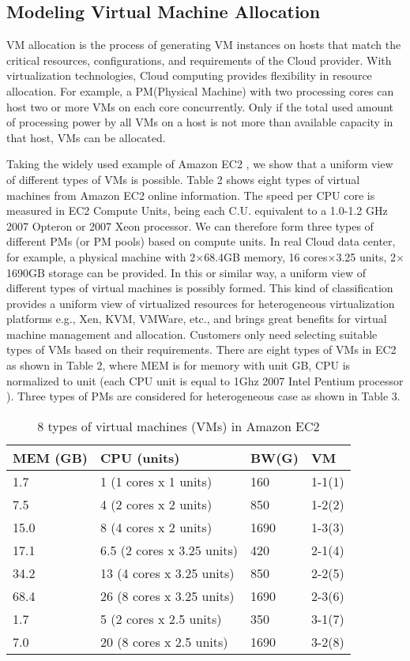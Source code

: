 \documentclass[3p, twocolumn]{elsarticle}
\begin{document}
\subsection{Modeling Virtual Machine Allocation}
VM allocation is the process of generating VM instances on hosts that match the critical resources, configurations, and requirements of the Cloud provider. With virtualization technologies, Cloud computing provides flexibility in resource allocation. For example, a PM(Physical Machine) with two processing cores can host two or more VMs on each core concurrently. Only if the total used amount of processing power by all VMs on a host is not more than available capacity in that host, VMs can be allocated.

Taking the widely used example of Amazon EC2 \cite{IEEEhowto:Amazon}, we show that a uniform view of different types of VMs is possible. Table 2 shows eight types of virtual machines from Amazon EC2 online information. The speed per CPU core is measured in EC2 Compute Units, being each C.U. equivalent to a 1.0-1.2 GHz 2007 Opteron or 2007 Xeon processor. We can therefore form three types of different PMs (or PM pools) based on compute units. In real Cloud data center, for example, a physical machine with 2$\times$68.4GB memory, 16 cores$\times$3.25 units, 2$\times$1690GB storage can be provided. In this or similar way, a uniform view of different types of virtual machines is possibly formed. This kind of classification provides a uniform view of virtualized resources for heterogeneous virtualization platforms e.g., Xen, KVM, VMWare, etc., and brings great benefits for virtual machine management and allocation. Customers only need selecting suitable types of VMs based on their requirements. There are eight types of VMs in EC2 as shown in Table 2, where MEM is for memory with unit GB, CPU is normalized to unit (each CPU unit is equal to 1Ghz 2007 Intel Pentium processor \cite{IEEEhowto:Amazon}). Three types of PMs are considered for heterogeneous case as shown in Table 3.
\begin{table}
\footnotesize
\caption{8 types of virtual machines (VMs) in Amazon EC2
}
\begin{center}
\begin{tabular}{|l|l|l||l|}
\hline MEM (GB) & CPU (units)& BW(G)&VM
\\\hline
\hline 1.7 & 1 (1 cores x 1 units)& 160& 1-1(1) \\
\hline 7.5 &4 (2 cores x 2 units) & 850& 1-2(2) \\
\hline 15.0& 8 (4 cores x 2 units) &1690&1-3(3) \\
\hline 17.1& 6.5 (2 cores x 3.25 units) &420&2-1(4)\\
\hline 34.2& 13 (4 cores x 3.25 units) &850&2-2(5)\\
\hline 68.4& 26 (8 cores x 3.25 units) &1690&2-3(6)\\
\hline 1.7& 5 (2 cores x 2.5 units) &350&3-1(7) \\
\hline 7.0& 20 (8 cores x 2.5 units) &1690&3-2(8)\\
\hline
\end{tabular} \\
\end{center}
\end{table}
\end{document}
